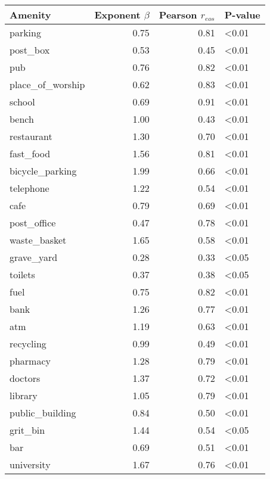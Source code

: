 \begin{tabular}{lrrl}
\toprule
Amenity &  Exponent $\beta$ &  Pearson $r_{eos}$ & P-value \\
\midrule
parking          &      0.75 &       0.81 &   <0.01 \\
post\_box         &      0.53 &       0.45 &   <0.01 \\
pub              &      0.76 &       0.82 &   <0.01 \\
place\_of\_worship &      0.62 &       0.83 &   <0.01 \\
school           &      0.69 &       0.91 &   <0.01 \\
bench            &      1.00 &       0.43 &   <0.01 \\
restaurant       &      1.30 &       0.70 &   <0.01 \\
fast\_food        &      1.56 &       0.81 &   <0.01 \\
bicycle\_parking  &      1.99 &       0.66 &   <0.01 \\
telephone        &      1.22 &       0.54 &   <0.01 \\
cafe             &      0.79 &       0.69 &   <0.01 \\
post\_office      &      0.47 &       0.78 &   <0.01 \\
waste\_basket     &      1.65 &       0.58 &   <0.01 \\
grave\_yard       &      0.28 &       0.33 &   <0.05 \\
toilets          &      0.37 &       0.38 &   <0.05 \\
fuel             &      0.75 &       0.82 &   <0.01 \\
bank             &      1.26 &       0.77 &   <0.01 \\
atm              &      1.19 &       0.63 &   <0.01 \\
recycling        &      0.99 &       0.49 &   <0.01 \\
pharmacy         &      1.28 &       0.79 &   <0.01 \\
doctors          &      1.37 &       0.72 &   <0.01 \\
library          &      1.05 &       0.79 &   <0.01 \\
public\_building  &      0.84 &       0.50 &   <0.01 \\
grit\_bin         &      1.44 &       0.54 &   <0.05 \\
bar              &      0.69 &       0.51 &   <0.01 \\
university       &      1.67 &       0.76 &   <0.01 \\

\end{tabular}
